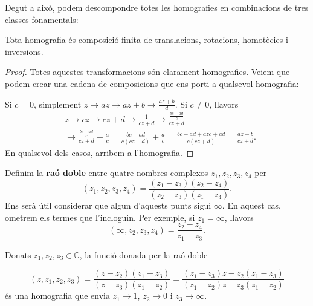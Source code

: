 \documentclass[dvipsnames, svgnames, leqno, a4paper, 12pt]{article}
\begin{document}
        Degut a això, podem descompondre totes les homografies en combinacions de tres classes fonamentals:
        
        \begin{theorem}\label{th:deschomo}
            Tota homografia és composició finita de translacions, rotacions, homotècies i inversions.
        \end{theorem}
        
        \begin{proof}
            Totes aquestes transformacions són clarament homografies. Veiem que podem crear una cadena de composicions que ens porti a qualsevol homografia:
            
            Si $c=0$, simplement $z\to az\to az+b\to \frac{az+b}{d}$. Si $c\neq0$, llavors 
            \begin{align*}
                &z\to cz\to cz+d\to \frac{1}{cz+d}\to \frac{\frac{bc-ad}{c}}{cz+d}\\
                &\to \frac{\frac{bc-ad}{c}}{cz+d}+\frac{a}{c}=\frac{bc-ad}{c(cz+d)}+\frac{a}{c}=\frac{bc-ad+azc+ad}{c(cz+d)}=\frac{az+b}{cz+d}.
            \end{align*}
            En qualsevol dels casos, arribem a l'homografia.
        \end{proof}

        \noindent Definim la \textbf{raó doble} entre quatre nombres complexos $z_1,z_2,z_3,z_4$ per 
        \begin{displaymath}
                (z_1,z_2,z_3,z_4) = \frac{(z_1-z_3)(z_2-z_4)}{(z_2-z_3)(z_1-z_4)}.
        \end{displaymath}
        Ens serà útil considerar que algun d'aquests punts sigui $\infty$. En aquest cas, ometrem els termes que l'incloguin. Per exemple, si $z_1 = \infty$, llavors 
        \begin{displaymath}
                (\infty, z_2,z_3,z_4) = \frac{z_2-z_4}{z_1-z_3}.
        \end{displaymath}

        \noindent Donats $z_1,z_2,z_3\in\mathbb{C}$, la funció donada per la raó doble 
        
        \begin{equation}\label{eq:rao_doble}
            (z,z_1,z_2,z_3) = \frac{(z-z_2)(z_1-z_3)}{(z-z_3)(z_1-z_2)}=\frac{(z_1-z_3)z-z_2(z_1-z_3)}{(z_1-z_2)z-z_3(z_1-z_2)}
        \end{equation}
        és una homografia que envia $z_1\to1$, $z_2\to0$ i $z_3\to\infty$.
\end{document}
